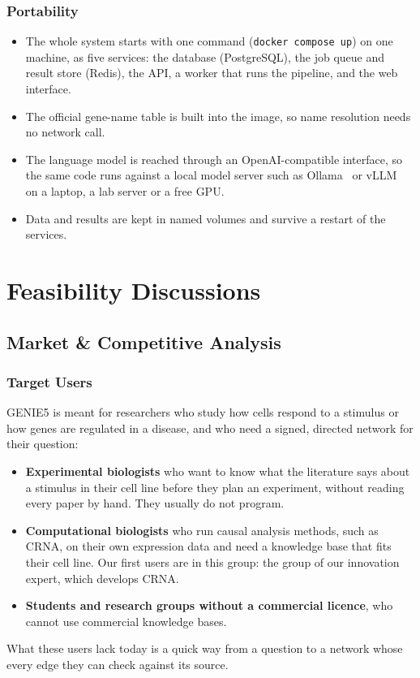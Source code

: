 \documentclass[11pt,a4paper]{article}
\newcommand{\gen}{GENIE5}
\newcommand{\code}[1]{\texttt{#1}}
\begin{document}
\subsubsection{Portability}
\begin{itemize}
  \item The whole system starts with one command (\code{docker compose up}) on one machine, as five
    services: the database (PostgreSQL), the job queue and result store (Redis), the API, a worker
    that runs the pipeline, and the web interface.
  \item The official gene-name table is built into the image, so name resolution needs no network
    call.
  \item The language model is reached through an OpenAI-compatible interface, so the same code runs
    against a local model server such as Ollama~\cite{ollama} or vLLM~\cite{vllm} on a laptop, a lab
    server or a free GPU.
  \item Data and results are kept in named volumes and survive a restart of the services.
\end{itemize}

\section{Feasibility Discussions}

\subsection{Market \& Competitive Analysis}

\subsubsection{Target Users}

\gen{} is meant for researchers who study how cells respond to a stimulus or how genes are
regulated in a disease, and who need a signed, directed network for their question:
\begin{itemize}
  \item \textbf{Experimental biologists} who want to know what the literature says about a
    stimulus in their cell line before they plan an experiment, without reading every paper by
    hand. They usually do not program.
  \item \textbf{Computational biologists} who run causal analysis methods, such as CRNA, on their
    own expression data and need a knowledge base that fits their cell line. Our first users are
    in this group: the group of our innovation expert, which develops CRNA.
  \item \textbf{Students and research groups without a commercial licence}, who cannot use
    commercial knowledge bases.
\end{itemize}
What these users lack today is a quick way from a question to a network whose every edge they can
check against its source.
\end{document}
